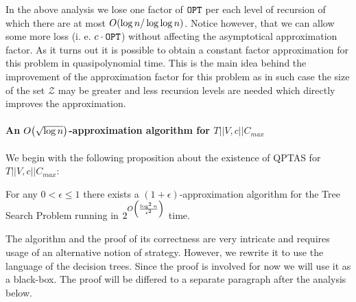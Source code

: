 In the above analysis we lose one factor of $\texttt{OPT}$ per each level of recursion of which there are at most $O\mathopen{}\left( \log n/\log\log n \right)$. Notice however, that we can allow some more loss (i. e. $c\cdot\texttt{OPT}$) without affecting the asymptotical approximation factor. As it turns out it is possible to obtain a constant factor approximation for this problem in quasipolynomial time. This is the main idea behind the improvement of the approximation factor for this problem as in such case the size of the set $\mathcal{Z}$ may be greater and less recursion levels are needed which directly improves the approximation.
\paragraph{An $O\mathopen{}\left( \sqrt{\log n} \right)$-approximation algorithm for $T||V,c||C_{max}$}
We begin with the following proposition \cite{dereniowski2017ApproxSsForGeneralBSinWTs} about the existence of QPTAS for $T||V,c||C_{max}$:
\begin{proposition}\label{QPTAS}
     For any $0 < \epsilon \leq 1$ there exists a $(1+\epsilon)$-approximation algorithm for the Tree Search Problem running in $2^{O\mathopen{}\left( \frac{\log^2n}{\epsilon^2} \right)}$ time.
\end{proposition}
The algorithm and the proof of its correctness are very intricate and requires usage of an alternative notion of strategy. However, we rewrite it to use the language of the decision trees. Since the proof is involved for now we will use it as a black-box. The proof will be differed to a separate paragraph after the analysis below.

